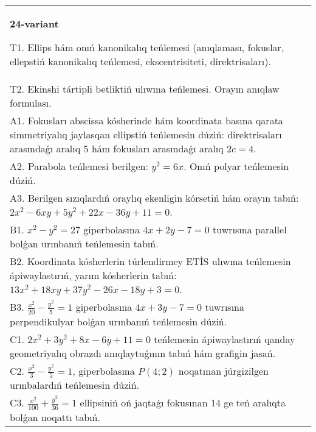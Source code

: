 \documentclass{article}
\begin{document}
\begin{tabular}{m{17cm}}
\textbf{24-variant}
\newline

T1. Ellips hám onıń kanonikalıq teńlemesi (anıqlaması, fokuslar, ellepstiń kanonikalıq teńlemesi, ekscentrisiteti, direktrisaları).\\

T2. Ekinshi tártipli betliktiń ulıwma teńlemesi. Orayın anıqlaw formulası.\\

A1. Fokusları abscissa kósherinde hám koordinata basına qarata simmetriyalıq jaylasqan ellipstiń teńlemesin dúziń: direktrisaları arasındaǵı aralıq $5$ hám fokusları arasındaǵı aralıq $2 c=4$.\\

A2. Parabola teńlemesi berilgen: $y^2=6 x$. Onıń polyar teńlemesin dúziń.\\

A3. Berilgen sızıqlardıń oraylıq ekenligin kórsetiń hám orayın tabıń: $2 x^{2}-6 xy+5 y^{2}+22 x-36 y+11=0$.\\

B1. $x^{2} - y^{2} = 27$ giperbolasına $4x + 2y - 7 = 0$ tuwrısına parallel bolǵan urınbanıń teńlemesin tabıń.  \\

B2. Koordinata kósherlerin túrlendirmey ETİS ulıwma teńlemesin ápiwaylastırıń, yarım kósherlerin tabıń: $13x^{2} + 18xy + 37y^{2} - 26x - 18y + 3 = 0$.  \\

B3. $\frac{x^{2}}{20} - \frac{y^{2}}{5} = 1$ giperbolasına $4x + 3y - 7 = 0$ tuwrısına perpendikulyar bolǵan urınbanıń teńlemesin dúziń.  \\

C1. $2x^{2} + 3y^{2} + 8x - 6y + 11 = 0$ teńlemesin ápiwaylastırıń qanday geometriyalıq obrazdı anıqlaytuǵının tabıń hám grafigin jasań.  \\

C2. $\frac{x^{2}}{3} - \frac{y^{2}}{5} = 1$, giperbolasına $P(4;2)$ noqatınan júrgizilgen urınbalardıń teńlemesin dúziń.  \\

C3. $\frac{x^{2}}{100} + \frac{y^{2}}{36} = 1$ ellipsiniń oń jaqtaǵı fokusınan 14 ge teń aralıqta bolǵan noqattı tabıń.  \\

\end{tabular}
\vspace{1cm}
\end{document}
